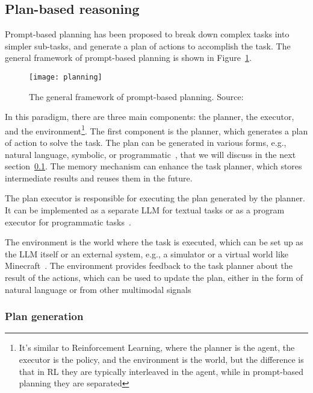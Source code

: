 \subsection{Plan-based reasoning}
\label{subsec:plan-based}

Prompt-based planning has been proposed to break down complex tasks into simpler sub-tasks, and generate a plan of actions to accomplish the task.
The general framework of prompt-based planning is shown in Figure~\ref{fig:planning}.

\begin{figure}[h!]
	\centering
	\texttt{[image: planning]}
	\caption{The general framework of prompt-based planning. Source: \textcite{survey}}
	\label{fig:planning}
\end{figure}

In this paradigm, there are three main components: the planner, the executor, and the environment\footnote{It's similar to Reinforcement Learning, where the planner is the agent, the executor is the policy, and the environment is the world, but the difference is that in RL they are typically interleaved in the agent, while in prompt-based planning they are separated}.
The first component is the planner, which generates a plan of action to solve the task.
The plan can be generated in various forms, e.g., natural language, symbolic, or programmatic~\cite{gao2022pal, zhou2022least}, that we will discuss in the next section~\ref{subsec:plan-based}.
The memory mechanism can enhance the task planner, which stores intermediate results and reuses them in the future.

The plan executor is responsible for executing the plan generated by the planner.
It can be implemented as a separate LLM for textual tasks or as a program executor for programmatic tasks~\cite{wang2023plan, gao2022pal}.

The environment is the world where the task is executed, which can be set up as the LLM itself or an external system, e.g., a simulator or a virtual world like Minecraft~\cite{yao2023tree, wang2023voyager}.
The environment provides feedback to the task planner about the result of the actions, which can be used to update the plan, either in the form of natural language or from other multimodal signals~\cite{shinn2023reflexion, lu2023multimodal}

\subsubsection{Plan generation}
\label{subsubsec:plan-generation}

